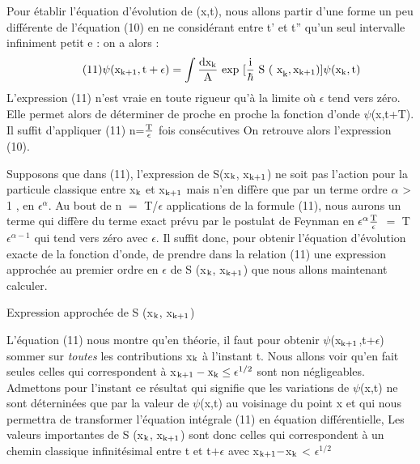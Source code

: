 Pour établir l'équation d'évolution de (x,t), nous allons
partir d'une forme un peu différente de l'équation (10) en ne considérant
entre t' et t'' qu'un seul intervalle infiniment petit e : on a alors :
\[
\tag{11}\psi(\text{x}_{\text{k+1}},\text{t}+\epsilon) = \int \frac{\text{dx}_{\text{k}}}{\text{A}}
\text{ exp }[\frac{\text{i}}{\hbar} \text{ S ( x}_{\text{k}}, \text{x}_{\text{k+1}} ) ]
\psi (\text{x}_{\text{k}}, \text{t} )
\]
L'expression (11) n'est vraie en toute rigueur qu'à la limite où $\epsilon$ tend
vers zéro. Elle permet alors de déterminer de proche en proche la fonction
d'onde $\psi$(x,t+T). Il suffit d'appliquer (11) n=$\frac{\text{T}}{\epsilon}$ fois consécutives
On retrouve alors l'expression (10).

Supposons que dans (11), l'expression de S(x$_{\text{k}}$, x$_{\text{k+1}}$) ne soit
pas l'action pour la particule classique entre x$_{\text{k}}$ et x$_{\text{k+1}}$ mais n'en diffère
que par un terme ordre $\alpha$ > 1 , en $\epsilon^\alpha$. Au bout de n $=$ T/$\epsilon$ applications
de la formule (11), nous aurons un terme qui diffère du terme exact prévu
par le postulat de Feynman en  $\epsilon^\alpha \frac{\text{T}}{\epsilon}$  $=$  T$\epsilon^{\alpha-1}$ qui tend vers zéro avec $\epsilon$. Il
suffit donc, pour obtenir l'équation d'évolution exacte de la fonction
d'onde, de prendre dans la relation (11) une expression approchée au premier
ordre en $\epsilon$ de S (x$_{\text{k}}$, x$_{\text{k+1}}$) que nous allons maintenant calculer.

Expression approchée de S (x$_{\text{k}}$, x$_{\text{k+1}}$)

\begin{center}
\end{center}
L'équation (11) nous montre qu'en théorie, il faut pour obtenir
$\psi$(x$_{\text{k+1}}$,t+$\epsilon$)
sommer sur {\it toutes} les contributions x$_{\text{k}}$ à l'instant t. Nous
allons voir qu'en fait seules celles qui correspondent à
x$_{\text{k+1}} - \text{x}_{\text{k}} \leq \epsilon^{1/2}$
sont non négligeables. Admettons pour l'instant ce résultat qui signifie
que les variations de $\psi$(x,t) ne sont déterninées que par la valeur de
$\psi$(x,t) au voisinage du point x et qui nous permettra de transformer
l'équation intégrale (11) en équation différentielle, Les valeurs importantes
de S (x$_{\text{k}}$, x$_{\text{k+1}}$) sont donc celles qui correspondent à un chemin
classique infinitésimal entre t et t$+\epsilon$ avec x$_{\text{k+1}} - $x$_{\text{k}}$ < $\epsilon^{1/2}$

